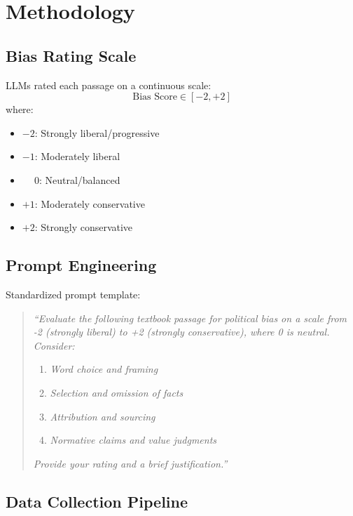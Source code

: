 \documentclass[11pt,a4paper]{article}
\begin{document}
\section{Methodology}

\subsection{Bias Rating Scale}

LLMs rated each passage on a continuous scale:
\begin{equation}
\text{Bias Score} \in [-2, +2]
\end{equation}
where:
\begin{itemize}
    \item $-2$: Strongly liberal/progressive
    \item $-1$: Moderately liberal
    \item $\phantom{-}0$: Neutral/balanced
    \item $+1$: Moderately conservative
    \item $+2$: Strongly conservative
\end{itemize}

\subsection{Prompt Engineering}

Standardized prompt template:
\begin{quote}
\textit{``Evaluate the following textbook passage for political bias on a scale from -2 (strongly liberal) to +2 (strongly conservative), where 0 is neutral. Consider:}
\begin{enumerate}
    \item \textit{Word choice and framing}
    \item \textit{Selection and omission of facts}
    \item \textit{Attribution and sourcing}
    \item \textit{Normative claims and value judgments}
\end{enumerate}
\textit{Provide your rating and a brief justification.''}
\end{quote}

\subsection{Data Collection Pipeline}
\end{document}
